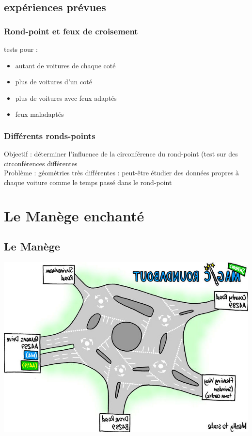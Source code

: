 \documentclass[slidetop,11pt]{beamer}
\begin{document}
	\subsection{expériences prévues}

\begin{frame}
	\frametitle{Rond-point et feux de croisement}
	tests pour :
	\begin{itemize}
		\item autant de voitures de chaque coté
		\item plus de voitures d'un coté
		\item plus de voitures avec feux adaptés
		\item feux maladaptés
	\end{itemize}
	
	\frametitle{Différents ronds-points}
	Objectif : déterminer l'influence de la circonférence du rond-point (test sur des circonférences différentes \\
	Problème : géométries très différentes : peut-être étudier des données propres à chaque voiture comme le temps passé dans le rond-point
\end{frame}

	
\section{Le Manège enchanté}
	\subsection{Le Manège}
\begin{frame}
	\begin{center}
		\includegraphics[scale=0.4]{./images/magic}
	\end{center}
\end{frame}
\end{document}
